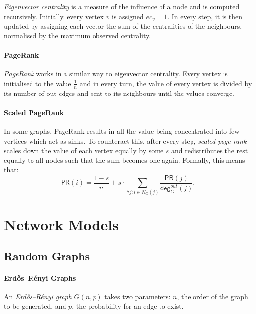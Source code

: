 \documentclass[english]{panikzettel}
\renewcommand\deg{\textsf{deg}}
\begin{document}
\textit{Eigenvector centrality} is a measure of the influence of a node and is computed recursively.
Initially, every vertex $v$ is assigned $ec_v = 1$.
In every step, it is then updated by assigning each vector the sum of the centralities of the neighbours, normalised by the maximum observed centrality.

\paragraph{PageRank}

\textit{PageRank} works in a similar way to eigenvector centrality.
Every vertex is initialised to the value $\frac{1}{n}$ and in every turn, the value of every vertex is divided by its number of out-edges and sent to its neighbours until the values converge.



\paragraph{Scaled PageRank}

In some graphs, PageRank results in all the value being concentrated into few vertices which act as sinks.
To counteract this, after every step, \textit{scaled page rank} scales down the value of each vertex equally by some $s$ and redistributes the rest equally to all nodes such that the sum becomes one again.
Formally, this means that:
\[
    \textsf{PR}(i) = \frac{1-s}{n}+s \cdot \sum_{\forall j: i \in N_G(j)}\frac{\textsf{PR}(j)}{\deg^{out}_G(j)}.
\]



\section{Network Models}

\subsection{Random Graphs}

\paragraph{Erdős–Rényi Graphs}

An \textit{Erdős–Rényi graph} $G(n,p)$ takes two parameters: $n$, the order of the graph to be generated, and $p$, the probability for an edge to exist.
\end{document}

